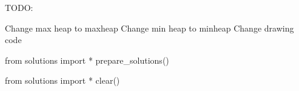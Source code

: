 
TODO:
\begin{itemize}
\li Change max heap to maxheap
\li Change min heap to minheap
\li Change drawing code
\end{itemize}


\newpage
\newpage
\newpage
\newpage
\newpage
\newpage
\newpage
\newpage
\newpage
\newpage
\newpage
\newpage
\newpage
\newpage
\newpage

\begin{python0}
from solutions import *
prepare_solutions()
\end{python0}

\begin{python0}
from solutions import *
clear()
\end{python0}
